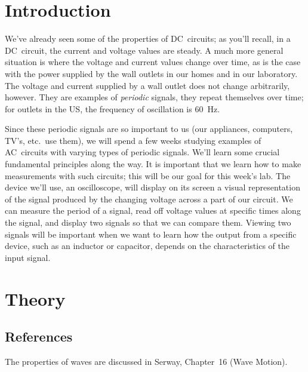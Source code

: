 \section{Introduction}

We've already seen some of the properties of DC~circuits; as you'll recall, in 
a DC~circuit, the current and voltage values are steady.  A much more general 
situation is where the voltage and current values change over time, as is the 
case with the power supplied by the wall outlets in our homes and in our 
laboratory.  The voltage and current supplied by a wall outlet does not change
arbitrarily, however. They are examples of {\it periodic} signals, they repeat 
themselves over time; for outlets in the US, the frequency of oscillation is 
60~Hz.  

Since these periodic signals are so important to us (our appliances, computers,
TV's, etc.\ use them), we will spend a few weeks studying examples of 
AC~circuits with varying types of periodic signals. We'll learn some crucial
fundamental principles along the way. It is important that we learn how to 
make measurements with such circuits; this will be our goal for this week's 
lab.  The device we'll use, an oscilloscope, will display on its screen a 
visual representation of the signal produced by the changing voltage across a 
part of our circuit. We can measure the period of a signal, read off voltage 
values at specific times along the signal, and display two signals so that we 
can compare them.  Viewing two signals will be important when we want to 
learn how the output from a specific device, such as an inductor or capacitor, 
depends on the characteristics of the input signal. 
\vfill
\pagebreak

\section{Theory}

\subsection{References}

The properties of waves are discussed in Serway, Chapter~16 (Wave Motion). 
 

